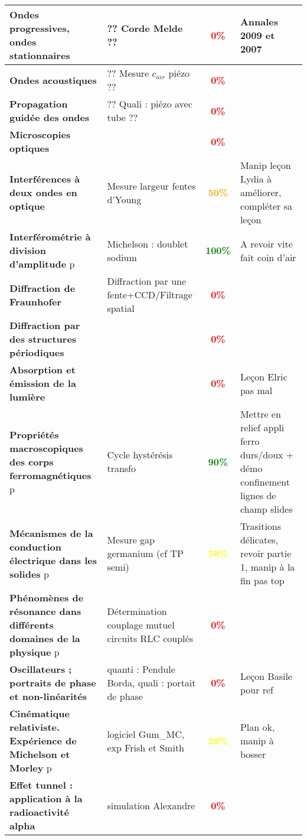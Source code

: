 \begin{changemargin}{-1.5cm}{-0cm}
\begin{center}
\begin{tabularx}{\paperwidth-2cm}{| X | X | c | X |}
\hline
  \textbf{Ondes progressives, ondes stationnaires} & ?? Corde Melde ?? & \textcolor{red}{\textbf{0\%}} & Annales 2009 et 2007 \\
  \hline
  \textbf{Ondes acoustiques} & ?? Mesure $c_{air}$ piézo ?? & \textcolor{red}{\textbf{0\%}} &  \\
  \hline
  \textbf{Propagation guidée des ondes} & ?? Quali : piézo avec tube  ?? & \textcolor{red}{\textbf{0\%}} & \\
  \hline
  \textbf{Microscopies optiques} & & \textcolor{red}{\textbf{0\%}} &  \\
  \hline
  \textbf{Interférences à deux ondes en optique} & Mesure largeur fentes d'Young & \textcolor{orange}{\textbf{50\%}} & Manip leçon Lydia à améliorer, compléter sa leçon \\
  \hline
  \textbf{Interférométrie à division d'amplitude} p\pageref{LP_DivisionAmplitude} & Michelson : doublet sodium & \textcolor{green}{\textbf{100\%}} & A revoir vite fait coin d'air \\
  \hline
  \textbf{Diffraction de Fraunhofer} & Diffraction par une fente+CCD/Filtrage spatial & \textcolor{red}{\textbf{0\%}} &  \\
  \hline
  \textbf{Diffraction par des structures périodiques} &  & \textcolor{red}{\textbf{0\%}} &  \\
  \hline
  \textbf{Absorption et émission de la lumière} &  & \textcolor{red}{\textbf{0\%}} & Leçon Elric pas mal \\
  \hline
  \hline
  \textbf{Propriétés macroscopiques des corps ferromagnétiques } p\pageref{LP_Ferromagnetisme} & Cycle hystérésis transfo & \textcolor{green}{\textbf{90\%}} & Mettre en relief appli ferro durs/doux + démo confinement lignes de champ slides \\
  \hline
  \textbf{Mécanismes de la conduction électrique dans les solides} p\pageref{LP_Conduction} & Mesure gap germanium (cf TP semi) & \textcolor{yellow}{\textbf{50\%}} & Trasitions délicates, revoir partie 1, manip à la fin pas top \\
  \hline
  \textbf{Phénomènes de résonance dans différents domaines de la physique} p\pageref{LP_resonance} & Détermination couplage mutuel circuits RLC couplés & \textcolor{red}{\textbf{0\%}} &  \\
  \hline
  \textbf{Oscillateurs ; portraits de phase et non-linéarités} & quanti : Pendule Borda, quali : portait de phase & \textcolor{red}{\textbf{0\%}} & Leçon Basile pour ref  \\
  \hline
  \hline
  \textbf{Cinématique relativiste. Expérience de Michelson et Morley} p\pageref{LP_CinematiqueRelativiste} & logiciel Gum\_MC, exp Frish et Smith & \textcolor{yellow}{\textbf{20\%}} & Plan ok, manip à bosser  \\
  \hline
  \textbf{Effet tunnel : application à la radioactivité alpha} & simulation Alexandre & \textcolor{red}{\textbf{0\%}} &   \\
  \hline
\end{tabularx}
\end{center}

\end{changemargin}